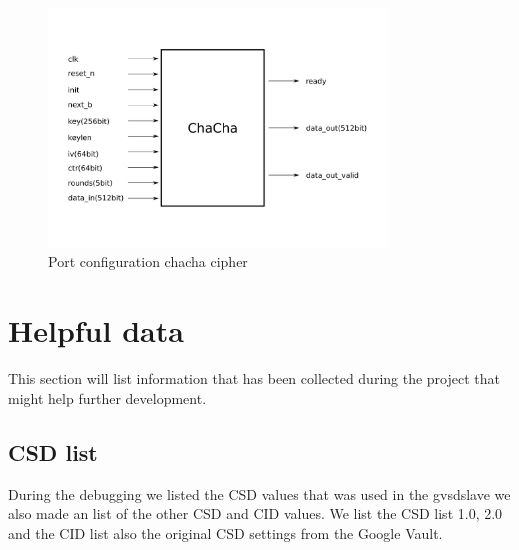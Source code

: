 \documentclass[]{article}
\begin{document}
\begin{figure}[h]
	\centering
	\includegraphics[width=0.8\textwidth]{ilustrations/chacha.pdf}
	\caption{Port configuration chacha cipher}
	\label{fig:chacha}
\end{figure}


\section{Helpful data}
This section will list information that has been collected during the project that might help further development.

\subsection{CSD list}
During the debugging we listed the CSD values that was used in the \gls{gvsdslave} we also made an list of the other CSD and CID values.
We list the CSD list 1.0, 2.0 and the CID list also the original CSD settings from the Google Vault.
\end{document}

